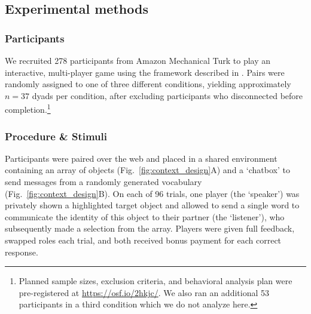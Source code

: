 			
\subsection{Experimental methods}

\subsubsection{Participants}

We recruited 278 participants from Amazon Mechanical Turk to play an interactive, multi-player game using the framework described in . Pairs were randomly assigned to one of three different conditions, yielding approximately $n=37$ dyads per condition, after excluding participants who disconnected before completion.\footnote{Planned sample sizes, exclusion criteria, and behavioral analysis plan were pre-registered at \url{https://osf.io/2hkjc/}. We also ran an additional 53 participants in a third condition which we do not analyze here.}

\subsubsection{Procedure \& Stimuli}
Participants were paired over the web and placed in a shared environment containing an array of objects (Fig.\ \ref{fig:context_design}A) and a `chatbox' to send messages from a randomly generated vocabulary (Fig.\ \ref{fig:context_design}B). On each of 96 trials, one player (the `speaker') was privately shown a highlighted target object and allowed to send a single word to communicate the identity of this object to their partner (the `listener'), who subsequently made a selection from the array. Players were given full feedback, swapped roles each trial, and both received bonus payment for each correct response.

